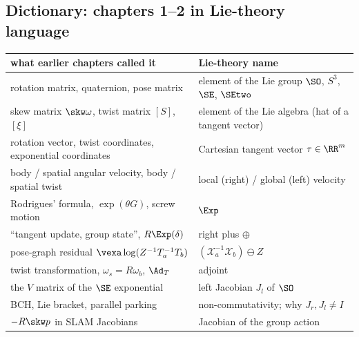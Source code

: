 \subsection{Dictionary: chapters 1--2 in Lie-theory language}\label{sec:lie:dictionary}

\begin{center}\small
\renewcommand{\arraystretch}{1.2}
\begin{tabularx}{\linewidth}{@{}>{\raggedright\arraybackslash}p{5.4cm}>{\raggedright\arraybackslash}X@{}}\toprule
what earlier chapters called it & Lie-theory name\\\midrule
rotation matrix, quaternion, pose matrix & element of the Lie group $\SO$, $S^3$, $\SE$, $\SEtwo$\\
skew matrix $\skw\omega$, twist matrix $[S]$, $[\xi]$ & element of the Lie algebra (hat of a tangent vector)\\
rotation vector, twist coordinates, exponential coordinates & Cartesian tangent vector $\tau\in\RR^m$\\
body / spatial angular velocity, body / spatial twist & local (right) / global (left) velocity\\
Rodrigues' formula, $\exp(\theta G)$, screw motion & $\Exp$\\
``tangent update, group state'', $R\Exp(\delta)$ & right plus $\oplus$\\
pose-graph residual $\vexa\log(Z^{-1}T_a^{-1}T_b)$ & $(\mathcal X_a^{-1}\mathcal X_b)\ominus Z$\\
twist transformation, $\omega_s=R\omega_b$, $\Ad_T$ & adjoint\\
the $V$ matrix of the $\SE$ exponential & left Jacobian $J_l$ of $\SO$\\
BCH, Lie bracket, parallel parking & non-commutativity; why $J_r,J_l\neq I$\\
$-R\skw p$ in SLAM Jacobians & Jacobian of the group action\\\bottomrule
\end{tabularx}
\end{center}
